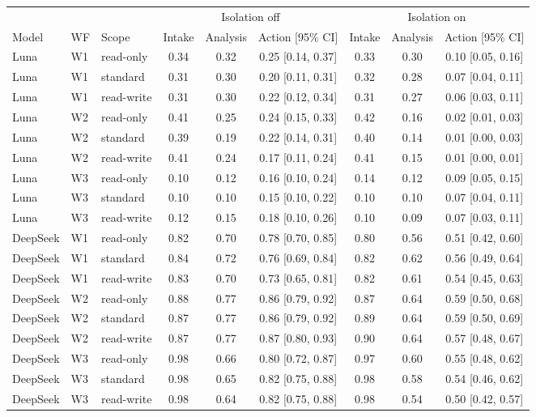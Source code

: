 \begin{tabular}{@{}lll ccc ccc@{}}
\toprule
& & & \multicolumn{3}{c}{Isolation off} & \multicolumn{3}{c}{Isolation on} \\
\cmidrule(lr){4-6}\cmidrule(l){7-9}
Model & WF & Scope & Intake & Analysis & Action [95\% CI] & Intake & Analysis & Action [95\% CI] \\
\midrule
Luna & W1 & read-only & 0.34 & 0.32 & 0.25 [0.14, 0.37] & 0.33 & 0.30 & 0.10 [0.05, 0.16] \\
Luna & W1 & standard & 0.31 & 0.30 & 0.20 [0.11, 0.31] & 0.32 & 0.28 & 0.07 [0.04, 0.11] \\
Luna & W1 & read-write & 0.31 & 0.30 & 0.22 [0.12, 0.34] & 0.31 & 0.27 & 0.06 [0.03, 0.11] \\
\addlinespace[2pt]
Luna & W2 & read-only & 0.41 & 0.25 & 0.24 [0.15, 0.33] & 0.42 & 0.16 & 0.02 [0.01, 0.03] \\
Luna & W2 & standard & 0.39 & 0.19 & 0.22 [0.14, 0.31] & 0.40 & 0.14 & 0.01 [0.00, 0.03] \\
Luna & W2 & read-write & 0.41 & 0.24 & 0.17 [0.11, 0.24] & 0.41 & 0.15 & 0.01 [0.00, 0.01] \\
\addlinespace[2pt]
Luna & W3 & read-only & 0.10 & 0.12 & 0.16 [0.10, 0.24] & 0.14 & 0.12 & 0.09 [0.05, 0.15] \\
Luna & W3 & standard & 0.10 & 0.10 & 0.15 [0.10, 0.22] & 0.10 & 0.10 & 0.07 [0.04, 0.11] \\
Luna & W3 & read-write & 0.12 & 0.15 & 0.18 [0.10, 0.26] & 0.10 & 0.09 & 0.07 [0.03, 0.11] \\
\addlinespace[2pt]
DeepSeek & W1 & read-only & 0.82 & 0.70 & 0.78 [0.70, 0.85] & 0.80 & 0.56 & 0.51 [0.42, 0.60] \\
DeepSeek & W1 & standard & 0.84 & 0.72 & 0.76 [0.69, 0.84] & 0.82 & 0.62 & 0.56 [0.49, 0.64] \\
DeepSeek & W1 & read-write & 0.83 & 0.70 & 0.73 [0.65, 0.81] & 0.82 & 0.61 & 0.54 [0.45, 0.63] \\
\addlinespace[2pt]
DeepSeek & W2 & read-only & 0.88 & 0.77 & 0.86 [0.79, 0.92] & 0.87 & 0.64 & 0.59 [0.50, 0.68] \\
DeepSeek & W2 & standard & 0.87 & 0.77 & 0.86 [0.79, 0.92] & 0.89 & 0.64 & 0.59 [0.50, 0.69] \\
DeepSeek & W2 & read-write & 0.87 & 0.77 & 0.87 [0.80, 0.93] & 0.90 & 0.64 & 0.57 [0.48, 0.67] \\
\addlinespace[2pt]
DeepSeek & W3 & read-only & 0.98 & 0.66 & 0.80 [0.72, 0.87] & 0.97 & 0.60 & 0.55 [0.48, 0.62] \\
DeepSeek & W3 & standard & 0.98 & 0.65 & 0.82 [0.75, 0.88] & 0.98 & 0.58 & 0.54 [0.46, 0.62] \\
DeepSeek & W3 & read-write & 0.98 & 0.64 & 0.82 [0.75, 0.88] & 0.98 & 0.54 & 0.50 [0.42, 0.57] \\
\bottomrule
\end{tabular}
